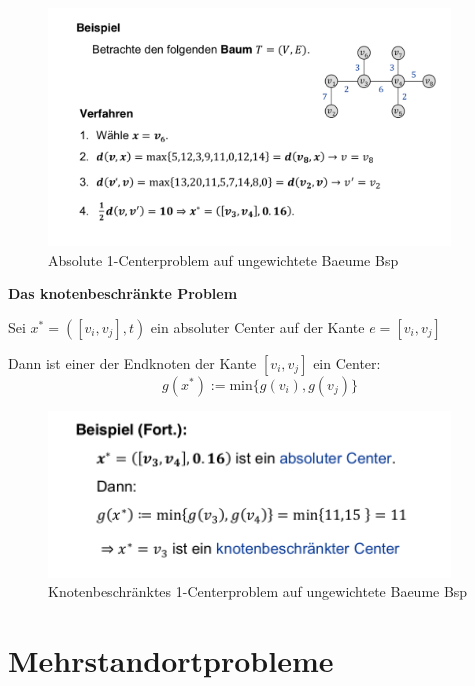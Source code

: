       \begin{figure}[H]
        \centering
        \includegraphics[width=0.95\textwidth]{Images/Absolut_1_Centerproblem_auf_ungewichtete_Baeume_Bsp.png}
        \caption{Absolute 1-Centerproblem auf ungewichtete Baeume Bsp}
        \label{fig:Absolut_1_Centerproblem_auf_ungewichtete_Baeume_Bsp}
      \end{figure}

      \par \textbf{Das knotenbeschränkte Problem}

      \par Sei $x^* = ([v_i, v_j], t)$ ein absoluter Center auf der Kante $e = [v_i, v_j]$
      \par Dann ist einer der Endknoten der Kante $[v_i, v_j]$ ein Center:
      \[g(x^*) := \text{min}\{g(v_i), g(v_j)\}\]

      \begin{exmp}
        
      \end{exmp}

      \begin{figure}[H]
        \centering
        \includegraphics[width=0.95\textwidth]{Images/Knotenbeschr_1_Centerproblem_auf_ungewichtete_Baeume_Bsp.png}
        \caption{Knotenbeschränktes 1-Centerproblem auf ungewichtete Baeume Bsp}
        \label{fig:Knotenbeschr_1_Centerproblem_auf_ungewichtete_Baeume_Bsp}
      \end{figure}


  \section{Mehrstandortprobleme} %
  \label{sec:mehrstandortprobleme}
  




    
